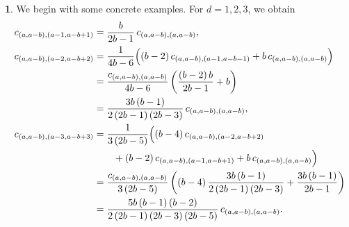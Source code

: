 \documentclass{mathincs}
\numberwithin{equation}{section}
\numberwithin{figure}{section}
\theoremstyle{plain}
\theoremstyle{definition}
\theoremstyle{remark}
\theoremstyle{plain}
\theoremstyle{definition}
\newtheorem{example}[thm]{\protect\examplename}
\theoremstyle{plain}
\theoremstyle{plain}
\providecommand{\examplename}{Example}
\begin{document}
\begin{example}\label{ex:twoparts}
We begin with some concrete examples.  For $d=1,2,3$, we obtain
\allowdisplaybreaks
\begin{align*}
  c_{\left(a,a-b\right),\left(a-1,a-b+1\right)} &=
    \frac{b}{2b-1}\,c_{\left(a,a-b\right),\left(a,a-b\right)}, \\
  c_{\left(a,a-b\right),\left(a-2,a-b+2\right)} &=
    \frac{1}{4b-6}\Bigl((b-2)\,c_{(a,a-b),(a-1,a-b-1)}+b\,c_{(a,a-b),(a,a-b)}\Bigr) \\
  &= \frac{c_{\left(a,a-b\right),\left(a,a-b\right)}}{4b-6}\left(\frac{\left(b-2\right)b}{2b-1}+b\right) \\
  &= \frac{3b\left(b-1\right)}{2\left(2b-1\right)\left(2b-3\right)}\,c_{(a,a-b),(a,a-b)}, \\
  c_{\left(a,a-b\right),\left(a-3,a-b+3\right)} &=
    \frac{1}{3\left(2b-5\right)}\Bigl(\left(b-4\right)c_{(a,a-b),(a-2,a-b+2)} \\
    &\qquad +\left(b-2\right)c_{(a,a-b),(a-1,a-b+1)}+b\, c_{(a,a-b),(a,a-b)}\Bigr)\\
  &= \frac{c_{\left(a,a-b\right),\left(a,a-b\right)}}{3\left(2b-5\right)}
    \left(\left(b-4\right)\frac{3b\left(b-1\right)}{2\left(2b-1\right)\left(2b-3\right)}+\frac{3b\left(b-1\right)}{2b-1}\right)\\
  &= \frac{5b\left(b-1\right)\left(b-2\right)}{2\left(2b-1\right)\left(2b-3\right)\left(2b-5\right)}\,c_{(a,a-b),(a,a-b)}.
\end{align*}
\end{example}
\end{document}
